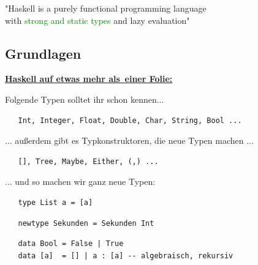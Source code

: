 \documentclass[unknownkeysallowed]{beamer}
\begin{document}

\begin{frame}
\begin{center}

  "Haskell is a purely functional programming language \\ with \textcolor{green}{strong and static types} and lazy evaluation"
  
\end{center}
\end{frame}

  \subsection{Grundlagen}
  \begin{frame}[fragile]
  
  \Large\textbf{\underline{Haskell auf \tiny etwas mehr als \,\Large einer Folie:}} \bigskip \normalsize
  
  Folgende Typen solltet ihr schon kennen...
  
  \begin{verbatim}
   Int, Integer, Float, Double, Char, String, Bool ...
  \end{verbatim}
  
  \pause
  
  ... außerdem gibt es Typkonstruktoren, die neue Typen machen ...
  
  \begin{verbatim}
   [], Tree, Maybe, Either, (,) ...
  \end{verbatim}
  
  \pause
  
  ... und so machen wir ganz neue Typen:

  \begin{verbatim}
   type List a = [a]
  \end{verbatim}
  
  \pause  
   
  \begin{verbatim}
   newtype Sekunden = Sekunden Int
  \end{verbatim}
  
  \pause
  
  \begin{verbatim}
   data Bool = False | True
   data [a]  = [] | a : [a] -- algebraisch, rekursiv
  \end{verbatim}
  
\end{frame}
\end{document}
